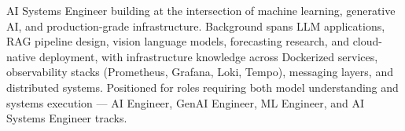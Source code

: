 AI Systems Engineer building at the intersection of machine learning, generative AI, and production-grade infrastructure. Background spans LLM applications, RAG pipeline design, vision language models, forecasting research, and cloud-native deployment, with infrastructure knowledge across Dockerized services, observability stacks (Prometheus, Grafana, Loki, Tempo), messaging layers, and distributed systems. Positioned for roles requiring both model understanding and systems execution --- AI Engineer, GenAI Engineer, ML Engineer, and AI Systems Engineer tracks.
